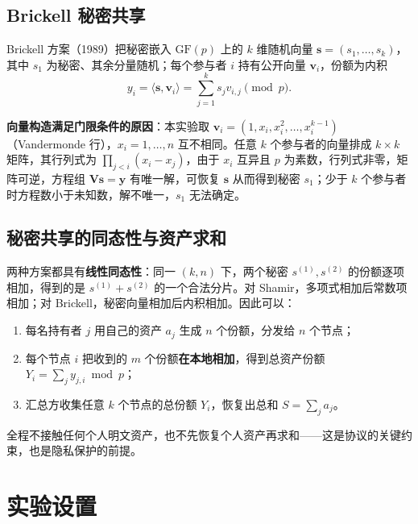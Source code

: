 \documentclass{SYSUReport}
\begin{document}
\subsection{Brickell 秘密共享}

Brickell 方案（1989）把秘密嵌入 $\mathrm{GF}(p)$ 上的 $k$ 维随机向量 $\mathbf{s} = (s_1, \ldots, s_k)$，其中 $s_1$ 为秘密、其余分量随机；每个参与者 $i$ 持有公开向量 $\mathbf{v}_i$，份额为内积
\begin{equation}
    y_i = \langle \mathbf{s}, \mathbf{v}_i \rangle = \sum_{j=1}^{k} s_j v_{i,j} \pmod p.
\end{equation}

\textbf{向量构造满足门限条件的原因}：本实验取 $\mathbf{v}_i = (1, x_i, x_i^2, \ldots, x_i^{k-1})$（Vandermonde 行），$x_i = 1, \ldots, n$ 互不相同。任意 $k$ 个参与者的向量排成 $k \times k$ 矩阵，其行列式为 $\prod_{j<i}(x_i - x_j)$，由于 $x_i$ 互异且 $p$ 为素数，行列式非零，矩阵可逆，方程组 $\mathbf{V}\mathbf{s} = \mathbf{y}$ 有唯一解，可恢复 $\mathbf{s}$ 从而得到秘密 $s_1$；少于 $k$ 个参与者时方程数小于未知数，解不唯一，$s_1$ 无法确定。

\subsection{秘密共享的同态性与资产求和}

两种方案都具有\textbf{线性同态性}：同一 $(k,n)$ 下，两个秘密 $s^{(1)}, s^{(2)}$ 的份额逐项相加，得到的是 $s^{(1)} + s^{(2)}$ 的一个合法分片。对 Shamir，多项式相加后常数项相加；对 Brickell，秘密向量相加后内积相加。因此可以：

\begin{enumerate}
    \item 每名持有者 $j$ 用自己的资产 $a_j$ 生成 $n$ 个份额，分发给 $n$ 个节点；
    \item 每个节点 $i$ 把收到的 $m$ 个份额\textbf{在本地相加}，得到总资产份额 $Y_i = \sum_j y_{j,i} \bmod p$；
    \item 汇总方收集任意 $k$ 个节点的总份额 $Y_i$，恢复出总和 $S = \sum_j a_j$。
\end{enumerate}

全程不接触任何个人明文资产，也不先恢复个人资产再求和——这是协议的关键约束，也是隐私保护的前提。

\section{实验设置}
\end{document}
